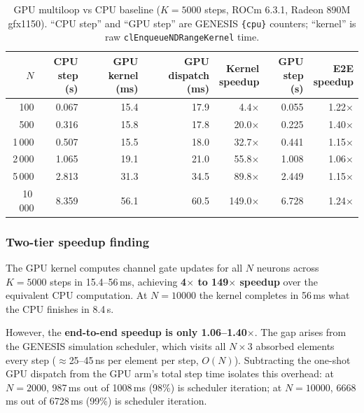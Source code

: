\documentclass[11pt,a4paper]{article}
\begin{document}
\begin{table}[H]
\centering
\footnotesize
\caption{GPU multiloop vs CPU baseline ($K = 5000$ steps, ROCm 6.3.1, Radeon 890M gfx1150). ``CPU step'' and ``GPU step'' are GENESIS \texttt{\{cpu\}} counters; ``kernel'' is raw \texttt{clEnqueueNDRangeKernel} time.}
\label{tab:multiloop}
\begin{tabular}{rrrrrrr}
\toprule
$N$ & \makecell[r]{CPU\\step (s)} & \makecell[r]{GPU\\kernel (ms)} & \makecell[r]{GPU\\dispatch (ms)} & \makecell[r]{Kernel\\speedup} & \makecell[r]{GPU\\step (s)} & \makecell[r]{E2E\\speedup} \\
\midrule
100    & 0.067 &  15.4 &  17.9 &   4.4$\times$ & 0.055 & 1.22$\times$ \\
500    & 0.316 &  15.8 &  17.8 &  20.0$\times$ & 0.225 & 1.40$\times$ \\
1\,000 & 0.507 &  15.5 &  18.0 &  32.7$\times$ & 0.441 & 1.15$\times$ \\
2\,000 & 1.065 &  19.1 &  21.0 &  55.8$\times$ & 1.008 & 1.06$\times$ \\
5\,000 & 2.813 &  31.3 &  34.5 &  89.8$\times$ & 2.449 & 1.15$\times$ \\
10\,000 & 8.359 & 56.1 &  60.5 & 149.0$\times$ & 6.728 & 1.24$\times$ \\
\bottomrule
\end{tabular}
\end{table}

\subsubsection*{Two-tier speedup finding}

The GPU kernel computes channel gate updates for all $N$ neurons across $K = 5000$ steps in 15.4--56\,ms, achieving \textbf{4$\times$ to 149$\times$ speedup} over the equivalent CPU computation. At $N = 10000$ the kernel completes in 56\,ms what the CPU finishes in 8.4\,s.

However, the \textbf{end-to-end speedup is only 1.06--1.40$\times$}. The gap arises from the GENESIS simulation scheduler, which visits all $N \times 3$ absorbed elements every step ($\approx$25--45\,ns per element per step, $O(N)$). Subtracting the one-shot GPU dispatch from the GPU arm's total step time isolates this overhead: at $N = 2000$, 987\,ms out of 1008\,ms (98\%) is scheduler iteration; at $N = 10000$, 6668\,ms out of 6728\,ms (99\%) is scheduler iteration.
\end{document}

